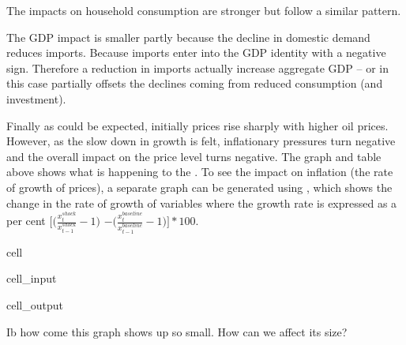 \documentclass[letterpaper,10pt,english]{jupyterBook}
\begin{document}
\sphinxAtStartPar
The impacts on household consumption are stronger but follow a similar pattern.

\sphinxAtStartPar
The GDP impact is smaller partly because the decline in domestic demand reduces imports.  Because imports enter into the GDP identity with a negative sign. Therefore a reduction in imports actually increase aggregate GDP – or in this case partially offsets the declines coming from reduced consumption (and investment).

\sphinxAtStartPar
Finally as could be expected, initially prices rise sharply with higher oil prices. However, as the slow down in growth is felt, inflationary pressures turn negative and the overall impact on the price level turns negative.  The graph and table above shows what is happening to the . To see the impact on inflation (the rate of growth of prices), a separate graph can be generated using , which shows the change in the rate of growth of variables where the growth rate is expressed as a per cent \(\bigg[\bigg(\frac{x^{shock}_t}{x^{shock}_{t-1}}-1\bigg)\) \( - \bigg(\frac{x^{baseline}_t}{x^{baseline}_{t-1}}-1\bigg)\Bigg]*100\).

\begin{sphinxuseclass}{cell}\begin{sphinxVerbatimInput}

\begin{sphinxuseclass}{cell_input}
\begin{sphinxVerbatim}[commandchars=\\\{\}]
\PYG{p}{[}\PYG{p}{]}
\end{sphinxVerbatim}

\end{sphinxuseclass}\end{sphinxVerbatimInput}
\begin{sphinxVerbatimOutput}

\begin{sphinxuseclass}{cell_output}
\noindent{}

\end{sphinxuseclass}\end{sphinxVerbatimOutput}

\end{sphinxuseclass}
\sphinxAtStartPar
 Ib how come this graph shows up so small.  How can we affect its size?
\end{document}
